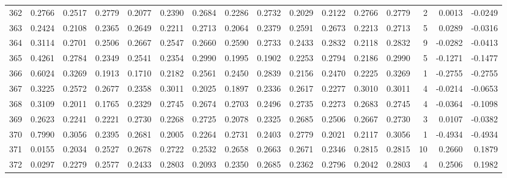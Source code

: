 \begin{tabular}{lrrrrrrrrrrrrrrr}
362 &      0.2766 &  0.2517 &  0.2779 &  0.2077 &  0.2390 &  0.2684 &  0.2286 &  0.2732 &  0.2029 &  0.2122 &   0.2766 &     0.2779 &      2 &                    0.0013 &                    -0.0249 \\
363 &      0.2424 &  0.2108 &  0.2365 &  0.2649 &  0.2211 &  0.2713 &  0.2064 &  0.2379 &  0.2591 &  0.2673 &   0.2213 &     0.2713 &      5 &                    0.0289 &                    -0.0316 \\
364 &      0.3114 &  0.2701 &  0.2506 &  0.2667 &  0.2547 &  0.2660 &  0.2590 &  0.2733 &  0.2433 &  0.2832 &   0.2118 &     0.2832 &      9 &                   -0.0282 &                    -0.0413 \\
365 &      0.4261 &  0.2784 &  0.2349 &  0.2541 &  0.2354 &  0.2990 &  0.1995 &  0.1902 &  0.2253 &  0.2794 &   0.2186 &     0.2990 &      5 &                   -0.1271 &                    -0.1477 \\
366 &      0.6024 &  0.3269 &  0.1913 &  0.1710 &  0.2182 &  0.2561 &  0.2450 &  0.2839 &  0.2156 &  0.2470 &   0.2225 &     0.3269 &      1 &                   -0.2755 &                    -0.2755 \\
367 &      0.3225 &  0.2572 &  0.2677 &  0.2358 &  0.3011 &  0.2025 &  0.1897 &  0.2336 &  0.2617 &  0.2277 &   0.3010 &     0.3011 &      4 &                   -0.0214 &                    -0.0653 \\
368 &      0.3109 &  0.2011 &  0.1765 &  0.2329 &  0.2745 &  0.2674 &  0.2703 &  0.2496 &  0.2735 &  0.2273 &   0.2683 &     0.2745 &      4 &                   -0.0364 &                    -0.1098 \\
369 &      0.2623 &  0.2241 &  0.2221 &  0.2730 &  0.2268 &  0.2725 &  0.2078 &  0.2325 &  0.2685 &  0.2506 &   0.2667 &     0.2730 &      3 &                    0.0107 &                    -0.0382 \\
370 &      0.7990 &  0.3056 &  0.2395 &  0.2681 &  0.2005 &  0.2264 &  0.2731 &  0.2403 &  0.2779 &  0.2021 &   0.2117 &     0.3056 &      1 &                   -0.4934 &                    -0.4934 \\
371 &      0.0155 &  0.2034 &  0.2527 &  0.2678 &  0.2722 &  0.2532 &  0.2658 &  0.2663 &  0.2671 &  0.2346 &   0.2815 &     0.2815 &     10 &                    0.2660 &                     0.1879 \\
372 &      0.0297 &  0.2279 &  0.2577 &  0.2433 &  0.2803 &  0.2093 &  0.2350 &  0.2685 &  0.2362 &  0.2796 &   0.2042 &     0.2803 &      4 &                    0.2506 &                     0.1982 \\

\end{tabular}
